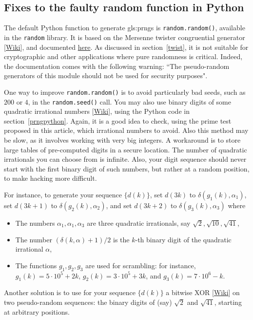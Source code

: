 \documentclass[oneside,10pt]{book}
\begin{document}
\subsection{Fixes to the faulty random function in Python}\label{fixp}

The default Python function to generate \glspl{gls:prng} is \texttt{random.random()}, available in the \texttt{random} library.
It is based on the \textcolor{index}{Mersenne twister} congruential generator [\href{https://en.wikipedia.org/wiki/Mersenne_Twister}{Wiki}], and documented \href{https://docs.python.org/3/library/random.html}{here}. As discussed in section~\ref{twist}, it is not suitable for cryptographic and other applications where pure randomness is critical. Indeed, the documentation comes with the following warning: ``The pseudo-random generators of this module should not be used for security purposes".

One way to improve  \texttt{random.random()} is to avoid particularly bad seeds, such as $200$ or $4$, in the \texttt{random.seed()} call. You may also use binary digits of some
\textcolor{index}{quadratic irrational numbers} [\href{https://en.wikipedia.org/wiki/Quadratic_irrational_number}{Wiki}], using the Python code in section~\ref{prngpython}. Again, it is a good idea to check, using the prime test proposed in this article, which irrational numbers to avoid. Also this method may be slow, as it involves working with very big integers. A workaround is to store large tables of pre-computed digits in a secure location. The number of quadratic irrationals you can choose from is infinite. Also, your digit sequence
 should never start with the first binary digit of such numbers, but rather at a random position, to make hacking more difficult.

For instance, to generate your sequence $\{d(k)\}$, set $d(3k)$ to $\delta(g_1(k),\alpha_1)$, set
 $d(3k+1)$ to $\delta(g_2(k),\alpha_2)$, and set  $d(3k+2)$ to $\delta(g_3(k),\alpha_3)$ where
\begin{itemize}
\item The numbers $\alpha_1, \alpha_1, \alpha_3$ are three quadratic irrationals, say $\sqrt{2},\sqrt{10},\sqrt{41}$,
\item The number $(\delta(k,\alpha)+1)/2$ is the $k$-th binary digit of the quadratic irrational $\alpha$,
\item The functions $g_1,g_2,g_3$ are used for scrambling: for instance,
$g_1(k)=5\cdot 10^5 +2k$, $g_2(k)=3\cdot 10^5 +3k$, and $g_3(k)=7\cdot 10^6 -k$.
\end{itemize}
Another solution is to use for your sequence $\{d(k)\}$ a \textcolor{index}{bitwise XOR} [\href{https://en.wikipedia.org/wiki/Bitwise_operation}{Wiki}] on two pseudo-random sequences: the binary digits of (say) $\sqrt{2}$ and $\sqrt{41}$, starting at arbitrary positions.
\end{document}
